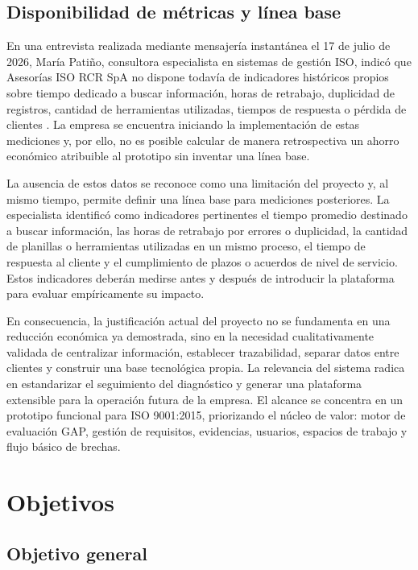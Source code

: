 \documentclass[final]{udpthesis}
\begin{document}
\section{Disponibilidad de métricas y línea base}

En una entrevista realizada mediante mensajería instantánea el 17 de julio de 2026, María Patiño, consultora especialista en sistemas de gestión ISO, indicó que Asesorías ISO RCR SpA no dispone todavía de indicadores históricos propios sobre tiempo dedicado a buscar información, horas de retrabajo, duplicidad de registros, cantidad de herramientas utilizadas, tiempos de respuesta o pérdida de clientes \cite{entrevista-whatsapp-maria}. La empresa se encuentra iniciando la implementación de estas mediciones y, por ello, no es posible calcular de manera retrospectiva un ahorro económico atribuible al prototipo sin inventar una línea base.

La ausencia de estos datos se reconoce como una limitación del proyecto y, al mismo tiempo, permite definir una línea base para mediciones posteriores. La especialista identificó como indicadores pertinentes el tiempo promedio destinado a buscar información, las horas de retrabajo por errores o duplicidad, la cantidad de planillas o herramientas utilizadas en un mismo proceso, el tiempo de respuesta al cliente y el cumplimiento de plazos o acuerdos de nivel de servicio. Estos indicadores deberán medirse antes y después de introducir la plataforma para evaluar empíricamente su impacto.

En consecuencia, la justificación actual del proyecto no se fundamenta en una reducción económica ya demostrada, sino en la necesidad cualitativamente validada de centralizar información, establecer trazabilidad, separar datos entre clientes y construir una base tecnológica propia. La relevancia del sistema radica en estandarizar el seguimiento del diagnóstico y generar una plataforma extensible para la operación futura de la empresa. El alcance se concentra en un prototipo funcional para ISO 9001:2015, priorizando el núcleo de valor: motor de evaluación GAP, gestión de requisitos, evidencias, usuarios, espacios de trabajo y flujo básico de brechas.

\chapter{Objetivos}

\section{Objetivo general}
\end{document}
